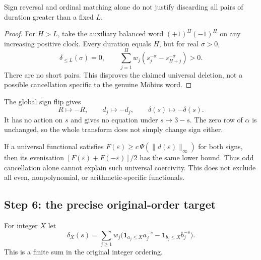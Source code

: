\begin{proposition}
\label{prop:a12-no-universal-tail}
Sign reversal and ordinal matching alone do not justify discarding all
pairs of duration greater than a fixed $L$.
\end{proposition}
\begin{proof}
For $H>L$, take the auxiliary balanced word $(+1)^H(-1)^H$ on any
increasing positive clock. Every duration equals $H$, but for real
$\sigma>0$,
\begin{equation}
\label{eq:a12-tail-counterexample}
\delta_{\le L}(\sigma)=0,\qquad
\sum_{j=1}^H w_j(s_j^{-\sigma}-s_{H+j}^{-\sigma})>0.
\end{equation}
There are no short pairs. This disproves the claimed universal deletion,
not a possible cancellation specific to the genuine M\"obius word.
\end{proof}

The global sign flip gives
\begin{equation}
\label{eq:a12-signflip}
R\mapsto-R,\qquad d_j\mapsto-d_j,\qquad \delta(s)\mapsto-\delta(s).
\end{equation}
It has no action on $s$ and gives no equation under $s\mapsto3-s$.
The zero row of $\alpha$ is unchanged, so the whole transform does not
simply change sign either.

If a universal functional satisfies
$F(\varepsilon)\ge c\,\Psi(\|d(\varepsilon)\|_\infty)$ for both signs,
then its evenisation
$[F(\varepsilon)+F(-\varepsilon)]/2$ has the same lower bound.
Thus odd cancellation alone cannot explain such universal coercivity.
This does not exclude all even, nonpolynomial, or arithmetic-specific
functionals.

\subsection{Step 6: the precise original-order target}
\label{subsec:a12-cauchy}
For integer $X$ let
\begin{equation}
\label{eq:a12-delta-X}
\delta_X(s)=\sum_{j\ge1}w_j
\bigl(\mathbf1_{a_j\le X}a_j^{-s}-\mathbf1_{b_j\le X}b_j^{-s}\bigr).
\end{equation}
This is a finite sum in the original integer ordering.

